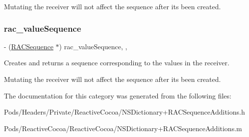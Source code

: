Mutating the receiver will not affect the sequence after it\textquotesingle{}s been created. \mbox{\label{category_n_s_dictionary_07_r_a_c_sequence_additions_08_ae87e0a78cf9cab6be27e18b0c3016439}} 
\subsubsection{\texorpdfstring{rac\+\_\+value\+Sequence}{rac\_valueSequence}}
{\footnotesize\ttfamily -\/ (\mbox{\hyperlink{interface_r_a_c_sequence}{R\+A\+C\+Sequence}} $\ast$) rac\+\_\+value\+Sequence\hspace{0.3cm}{\ttfamily [read]}, {\ttfamily [nonatomic]}, {\ttfamily [copy]}}

Creates and returns a sequence corresponding to the values in the receiver.

Mutating the receiver will not affect the sequence after it\textquotesingle{}s been created. 

The documentation for this category was generated from the following files\+:\begin{DoxyCompactItemize}
\item 
Pods/\+Headers/\+Private/\+Reactive\+Cocoa/N\+S\+Dictionary+\+R\+A\+C\+Sequence\+Additions.\+h\item 
Pods/\+Reactive\+Cocoa/\+Reactive\+Cocoa/N\+S\+Dictionary+\+R\+A\+C\+Sequence\+Additions.\+m\end{DoxyCompactItemize}
